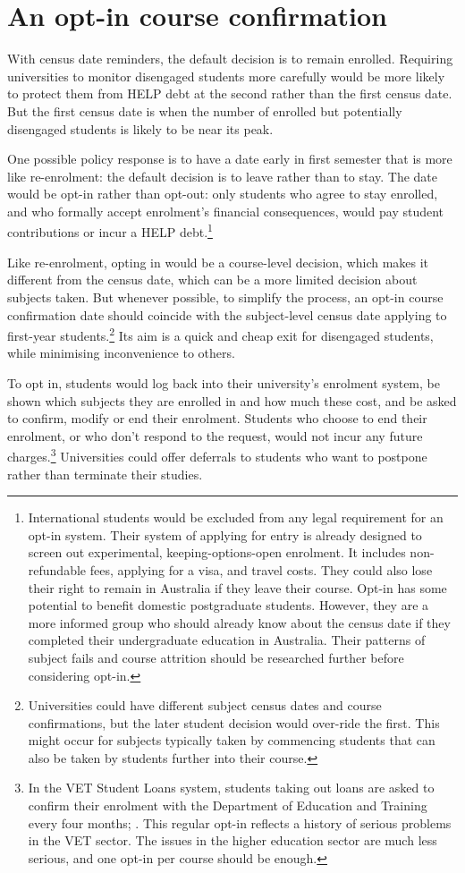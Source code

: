 \section{An opt-in course confirmation}\label{sec:8.4}

With census date reminders, the default decision is to remain enrolled. Requiring universities to monitor disengaged students more carefully would be more likely to protect them from HELP debt at the second rather than the first census date. But the first census date is when the number of enrolled but potentially disengaged students is likely to be near its peak.

One possible policy response is to have a date early in first semester that is more like re-enrolment: the default decision is to leave rather than to stay. The date would be opt-in rather than opt-out: only students who agree to stay enrolled, and who formally accept enrolment's financial consequences, would pay student contributions or incur a HELP debt.\footnote{International students would be excluded from any legal requirement for an opt-in system. Their system of applying for entry is already designed to screen out experimental, keeping-options-open enrolment. It includes non-refundable fees, applying for a visa, and travel costs. They could also lose their right to remain in Australia if they leave their course. Opt-in has some potential to benefit domestic postgraduate students. However, they are a more informed group who should already know about the census date if they completed their undergraduate education in Australia. Their patterns of subject fails and course attrition should be researched further before considering opt-in.}

Like re-enrolment, opting in would be a course-level decision, which makes it different from the census date, which can be a more limited decision about subjects taken. But whenever possible, to simplify the process, an opt-in course confirmation date should coincide with the subject-level census date applying to first-year students.\footnote{Universities could have different subject census dates and course confirmations, but the later student decision would over-ride the first. This might occur for subjects typically taken by commencing students that can also be taken by students further into their course.} Its aim is a quick and cheap exit for disengaged students, while minimising inconvenience to others.

To opt in, students would log back into their university's enrolment system, be shown which subjects they are enrolled in and how much these cost, and be asked to confirm, modify or end their enrolment. Students who choose to end their enrolment, or who don't respond to the request, would not incur any future charges.\footnote{In the VET Student Loans system, students taking out loans are asked to confirm their enrolment with the Department of Education and Training every four months; \textcite[][]{AustralianGovernment2017a}. This regular opt-in reflects a history of serious problems in the VET sector. The issues in the higher education sector are much less serious, and one opt-in per course should be enough.} Universities could offer deferrals to students who want to postpone rather than terminate their studies.


